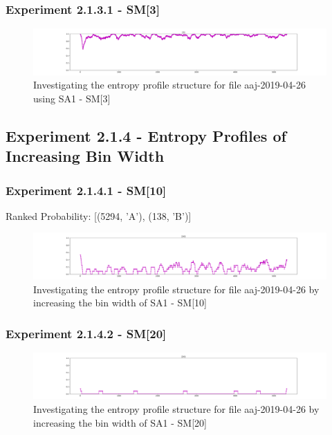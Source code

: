 \subsubsection{Experiment 2.1.3.1 - SM[3]}
    \begin{figure}[h]
    \begin{center}
    	\includegraphics[scale=0.2]{src/main-matter/results/experiment-age/entropy/window100/[3]}
    \caption{Investigating the entropy profile structure for file aaj-2019-04-26 using SA1 - SM[3]}
    \label{default}
    \end{center}
    \end{figure}

\clearpage

\subsection{Experiment 2.1.4 - Entropy Profiles of Increasing Bin Width}
\subsubsection{Experiment 2.1.4.1 - SM[10]}
 Ranked Probability: [(5294, 'A'), (138, 'B')]
    \begin{figure}[h]
    \begin{center}
    	\includegraphics[scale=0.2]{src/main-matter/results/experiment-age/entropy/window100/[10]}
    \caption{Investigating the entropy profile structure for file aaj-2019-04-26 by increasing the bin width of SA1 - SM[10]}
    \label{default}
    \end{center}
    \end{figure}

\subsubsection{Experiment 2.1.4.2 - SM[20]}
    \begin{figure}[h]
    \begin{center}
    	\includegraphics[scale=0.2]{src/main-matter/results/experiment-age/entropy/window100/[20]}
    \caption{Investigating the entropy profile structure for file aaj-2019-04-26 by increasing the bin width of SA1 - SM[20]}
    \label{default}
    \end{center}
    \end{figure}

